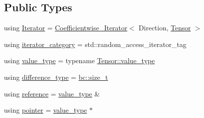 \subsection*{Public Types}
\begin{DoxyCompactItemize}
\item 
using \hyperlink{structbc_1_1tensors_1_1iterators_1_1Coefficientwise__Iterator_a313f76f47e60a806035279a36a84f835}{Iterator} = \hyperlink{structbc_1_1tensors_1_1iterators_1_1Coefficientwise__Iterator}{Coefficientwise\+\_\+\+Iterator}$<$ Direction, \hyperlink{namespacebc_a659391e47ab612be3ba6c18cf9c89159}{Tensor} $>$
\item 
using \hyperlink{structbc_1_1tensors_1_1iterators_1_1Coefficientwise__Iterator_ab2b61b8aa5dd97ce857a0988e640d74e}{iterator\+\_\+category} = std\+::random\+\_\+access\+\_\+iterator\+\_\+tag
\item 
using \hyperlink{structbc_1_1tensors_1_1iterators_1_1Coefficientwise__Iterator_a84e737fc2a829453cf0c7bb5997a487a}{value\+\_\+type} = typename \hyperlink{classbc_1_1tensors_1_1Tensor__Base_ae7e5c0119f62f43ef74c5a463d3eaf13}{Tensor\+::value\+\_\+type}
\item 
using \hyperlink{structbc_1_1tensors_1_1iterators_1_1Coefficientwise__Iterator_ae14251c51e153d27da01687742e1e7b0}{difference\+\_\+type} = \hyperlink{namespacebc_aaf8e3fbf99b04b1b57c4f80c6f55d3c5}{bc\+::size\+\_\+t}
\item 
using \hyperlink{structbc_1_1tensors_1_1iterators_1_1Coefficientwise__Iterator_a03f4d14739b564e4052b6f6de3fd7749}{reference} = \hyperlink{structbc_1_1tensors_1_1iterators_1_1Coefficientwise__Iterator_a84e737fc2a829453cf0c7bb5997a487a}{value\+\_\+type} \&
\item 
using \hyperlink{structbc_1_1tensors_1_1iterators_1_1Coefficientwise__Iterator_abad3e3527997ec4cfe787bcf062595ee}{pointer} = \hyperlink{structbc_1_1tensors_1_1iterators_1_1Coefficientwise__Iterator_a84e737fc2a829453cf0c7bb5997a487a}{value\+\_\+type} $\ast$
\end{DoxyCompactItemize}
